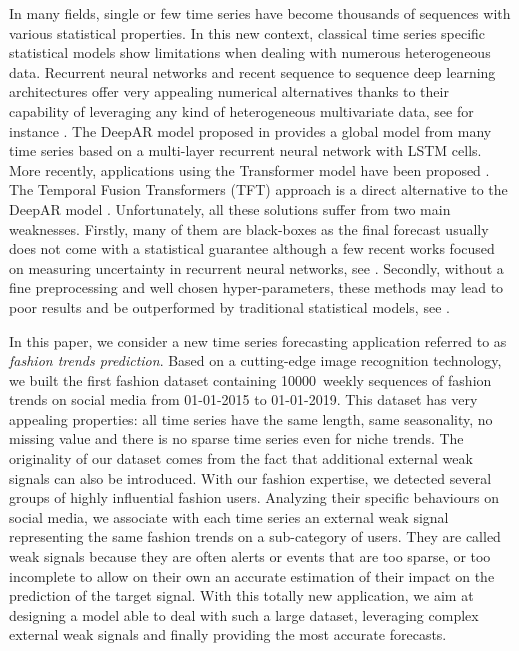 \documentclass[lettersize,journal]{IEEEtran}
\newcommand{\numberts}{10000}
\begin{document}
In many fields, single or few time series have become thousands of sequences with various statistical properties. In this new context, classical time series specific statistical models show limitations when dealing with numerous heterogeneous data. Recurrent neural networks and recent sequence to sequence deep learning architectures offer very appealing numerical alternatives thanks to their capability of leveraging any kind of heterogeneous multivariate data, see for instance \cite{ hochreiter1997long,vaswani2017attention, 8614252, li2019enhancing, lim2019temporal,salinas2020deepar}.  The DeepAR model proposed in \cite{salinas2020deepar} provides a global model from many time series based on a multi-layer recurrent neural network with LSTM cells. More recently, applications using the Transformer model have been proposed  \cite{li2019enhancing}. The Temporal Fusion Transformers (TFT) approach is a direct alternative to the DeepAR model \cite{lim2019temporal}.  Unfortunately, all these solutions suffer from two main weaknesses. Firstly, many of them are black-boxes  as the final forecast usually does not come with a statistical guarantee  although a few recent works focused on measuring uncertainty in recurrent neural networks, see  \cite{martin2020monte}. Secondly, without a fine preprocessing and well chosen hyper-parameters, these methods may lead to poor results and be outperformed by traditional statistical models, see \cite{makridakis2018m4}.

In this paper, we consider a  new time series forecasting application referred to as {\em fashion trends prediction}. Based on a cutting-edge image recognition technology, we built the first fashion dataset containing \numberts\ weekly sequences  of fashion trends on social media  from 01-01-2015 to 01-01-2019. This dataset has very appealing properties:  all time series have the same length, same seasonality, no missing value and there is no sparse time series even for niche trends. The originality of our dataset comes from the fact that additional external weak signals can also be introduced. With our fashion expertise, we detected several groups of highly influential fashion users. Analyzing their specific behaviours on social media, we associate with each time series an external weak signal representing the same fashion trends on a sub-category of users. They are called weak signals because they are often alerts or events that are too sparse, or too incomplete to allow on their own an accurate estimation of their impact on the prediction of the target signal. With this totally new application, we aim at designing a model able to deal with such a large dataset, leveraging  complex external weak signals and finally providing the most accurate forecasts.
 
\end{document}
